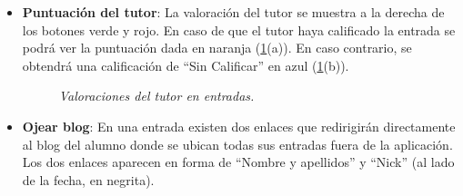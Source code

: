 \documentclass[a4paper, 12pt]{book}
\begin{document}
\begin{itemize}
  \item {\bfseries Puntuaci\'on del tutor}: La valoraci\'on del tutor se muestra a la derecha de los botones verde y rojo. En caso de que el tutor haya
  calificado la entrada se podr\'a ver la puntuaci\'on dada en naranja (\ref{figura:hiloalumno7}(a)). En caso contrario, se obtendr\'a una calificaci\'on de 
  ``Sin Calificar'' en azul (\ref{figura:hiloalumno7}(b)).
  \begin{figure}
    \centering
    \caption{\textit{Valoraciones del tutor en entradas.}}
    \label{figura:hiloalumno7}
  \end{figure}
  
  \item {\bfseries Ojear blog}: En una entrada existen dos enlaces que redirigir\'an directamente al blog del alumno donde se ubican todas sus entradas 
  fuera de la aplicaci\'on. Los dos enlaces aparecen en forma de ``Nombre y apellidos'' y ``Nick'' (al lado de la fecha, en negrita).
  

\end{itemize}
\end{document}
